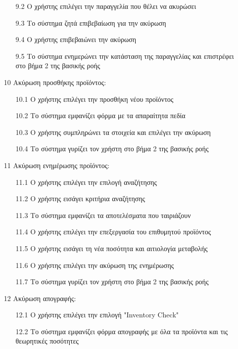 \documentclass[12pt,a4paper,twoside]{book}
\begin{document}
\begin{enumerate}
\begin{enumerate}
          \item [9.2 ] Ο χρήστης επιλέγει την παραγγελία που θέλει να ακυρώσει
          \item [9.3 ] Το σύστημα ζητά επιβεβαίωση για την ακύρωση
          \item [9.4 ] Ο χρήστης επιβεβαιώνει την ακύρωση
          \item [9.5 ] Το σύστημα ενημερώνει την κατάσταση της παραγγελίας και επιστρέφει στο βήμα 2 της βασικής ροής
        \end{enumerate}
  \item[10 ] Ακύρωση προσθήκης προϊόντος:
        \begin{enumerate}
          \item [10.1 ] Ο χρήστης επιλέγει την προσθήκη νέου προϊόντος
          \item [10.2 ] Το σύστημα εμφανίζει φόρμα με τα απαραίτητα πεδία
          \item [10.3 ] Ο χρήστης συμπληρώνει τα στοιχεία και επιλέγει την ακύρωση
          \item [10.4 ] Το σύστημα γυρίζει τον χρήστη στο βήμα 2 της βασικής ροής
        \end{enumerate}
  \item[11 ] Ακύρωση ενημέρωσης προϊόντος:
        \begin{enumerate}
          \item [11.1 ] Ο χρήστης επιλέγει την επιλογή αναζήτησης
          \item [11.2 ] Ο χρήστης εισάγει κριτήρια αναζήτησης %
          \item [11.3 ] Το σύστημα εμφανίζει τα αποτελέσματα που ταιριάζουν
          \item [11.4 ] Ο χρήστης επιλέγει την επεξεργασία του επιθυμητού προϊόντος
          \item [11.5 ] Ο χρήστης εισάγει τη νέα ποσότητα και αιτιολογία μεταβολής %
          \item [11.6 ] Ο χρήστης επιλέγει την ακύρωση της ενημέρωσης
          \item [11.7 ] Το σύστημα γυρίζει τον χρήστη στο βήμα 2 της βασικής ροής
        \end{enumerate}
  \item[12 ] Ακύρωση απογραφής:
        \begin{enumerate}
          \item [12.1 ] Ο χρήστης επιλέγει την επιλογή "Inventory Check"
          \item [12.2 ] Το σύστημα εμφανίζει φόρμα απογραφής με όλα τα προϊόντα και τις θεωρητικές ποσότητες

\end{enumerate}
\end{enumerate}
\end{document}
